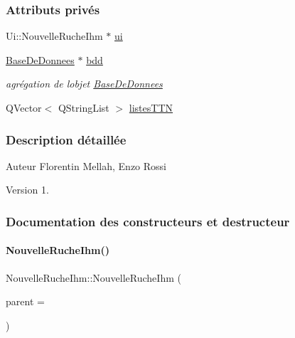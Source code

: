 \subsubsection*{Attributs privés}
\begin{DoxyCompactItemize}
\item 
Ui\+::\+Nouvelle\+Ruche\+Ihm $\ast$ \hyperlink{class_nouvelle_ruche_ihm_a46c1f0446fc75c67847d152d89d75960}{ui}
\item 
\hyperlink{class_base_de_donnees}{Base\+De\+Donnees} $\ast$ \hyperlink{class_nouvelle_ruche_ihm_af552d9e6944c266060860d911878cff7}{bdd}
\begin{DoxyCompactList}\small\item\em agrégation de l\textquotesingle{}objet \hyperlink{class_base_de_donnees}{Base\+De\+Donnees} \end{DoxyCompactList}\item 
Q\+Vector$<$ Q\+String\+List $>$ \hyperlink{class_nouvelle_ruche_ihm_a0c97db3419bafe928aabed3aa01d46fb}{listes\+T\+TN}
\end{DoxyCompactItemize}


\subsubsection{Description détaillée}
\begin{DoxyAuthor}{Auteur}
Florentin Mellah, Enzo Rossi
\end{DoxyAuthor}
\begin{DoxyVersion}{Version}
1. 
\end{DoxyVersion}


\subsubsection{Documentation des constructeurs et destructeur}
\mbox{\label{class_nouvelle_ruche_ihm_a338b9af0b96ed0839a8d5008c8c89cc4}} 
\paragraph{\texorpdfstring{Nouvelle\+Ruche\+Ihm()}{NouvelleRucheIhm()}}
{\footnotesize\ttfamily Nouvelle\+Ruche\+Ihm\+::\+Nouvelle\+Ruche\+Ihm (\begin{DoxyParamCaption}\item[{\hyperlink{class_q_widget}{Q\+Widget} $\ast$}]{parent = {} }\end{DoxyParamCaption})\hspace{0.3cm}{\ttfamily [explicit]}}


